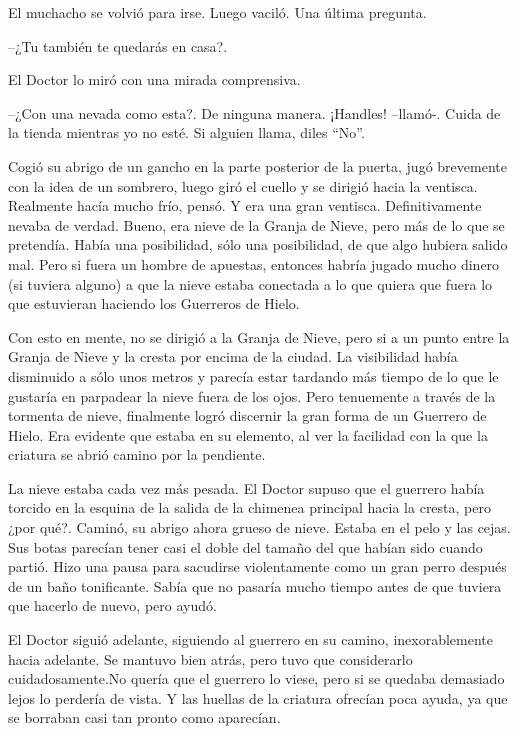 El muchacho se volvió para irse. Luego vaciló. Una última pregunta.


--¿Tu también te quedarás en casa?.



El Doctor lo miró con una mirada comprensiva. 


--¿Con una nevada como esta?. De ninguna manera. ¡Handles! --llamó-. Cuida de la tienda mientras yo no esté. Si alguien llama, diles ``No''.



Cogió su abrigo de un gancho en la parte posterior de la puerta, jugó brevemente con la idea de un sombrero, luego giró el cuello y se dirigió hacia la ventisca. Realmente hacía mucho frío, pensó. Y era una gran ventisca. Definitivamente nevaba de verdad. Bueno, era nieve de la Granja de Nieve, pero más de lo que se pretendía. Había una posibilidad, sólo una posibilidad, de que algo hubiera salido mal. Pero si fuera un hombre de apuestas, entonces habría jugado mucho dinero (si tuviera alguno) a que la nieve estaba conectada a lo que quiera que fuera lo que estuvieran haciendo los Guerreros de Hielo.



Con esto en mente, no se dirigió a la Granja de Nieve, pero si a un punto entre la Granja de Nieve y la cresta por encima de la ciudad. La visibilidad había disminuido a sólo unos metros y parecía estar tardando más tiempo de lo que le gustaría en parpadear la nieve fuera de los ojos. Pero tenuemente a través de la tormenta de nieve, finalmente logró discernir la gran forma de un Guerrero de Hielo. Era evidente que estaba en su elemento, al ver la facilidad con la que la criatura se abrió camino por la pendiente.



La nieve estaba cada vez más pesada. El Doctor supuso que el guerrero había torcido en la esquina de la salida de la chimenea principal hacia la cresta, pero ¿por qué?. Caminó, su abrigo ahora grueso de nieve. Estaba en el pelo y las cejas. Sus botas parecían tener casi el doble del tamaño del que habían sido cuando partió. Hizo una pausa para sacudirse violentamente como un gran perro después de un baño tonificante. Sabía que no pasaría mucho tiempo antes de que tuviera que hacerlo de nuevo, pero ayudó.



El Doctor siguió adelante, siguiendo al guerrero en su camino, inexorablemente hacia adelante. Se mantuvo bien atrás, pero tuvo que considerarlo cuidadosamente.No quería que el guerrero lo viese, pero si se quedaba demasiado lejos lo perdería de vista. Y las huellas de la criatura ofrecían poca ayuda, ya que se borraban casi tan pronto como aparecían.



